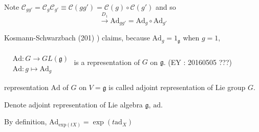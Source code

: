 Note $\mathcal{C}_{gg'} = \mathcal{C}_g \mathcal{C}_{g'} \equiv \mathcal{C}(gg') = \mathcal{C}(g)\circ \mathcal{C}(g')$ and so 
\[
\xrightarrow{ D_1} \text{Ad}_{gg'} = \text{Ad}_g \circ \text{Ad}_{g'}
\]

Kosmann-Schwarzbach (201) \cite{dgdt:YKosmann-Schwarzbach2010}) claims, because $\text{Ad}_g = 1_{\mathfrak{g}}$ when $g=1$, 

$\begin{aligned} & \quad \\
& \text{Ad}:G \to GL(\mathfrak{g}) \\
& \text{Ad}:g\mapsto \text{Ad}_g\end{aligned}$ is a representation of $G$ on $\mathfrak{g}$.   (EY : 20160505 ???)

\begin{definition}
	representation $\text{Ad}$ of $G$ on $V=\mathfrak{g}$ is called adjoint representation of Lie group $G$.  
\end{definition}

Denote adjoint representation of Lie algebra $\mathfrak{g}$, $\text{ad}$.  

By definition, $\text{Ad}_{\text{exp}(tX)} = \exp{ (t\text{ad}_X)}$

